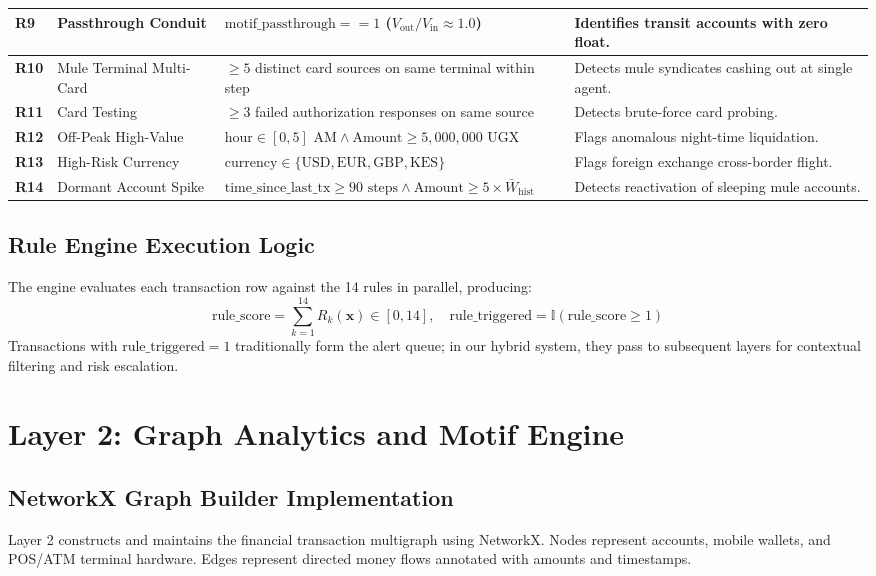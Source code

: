\begin{table}[hbt!]
\begin{adjustbox}{width=\textwidth,center=\textwidth}
\begin{tabular}{|l|l|p{6.5cm}|p{4.2cm}|}
\hline
\textbf{R9} & Passthrough Conduit & $\text{motif\_passthrough} == 1$ ($V_{\text{out}} / V_{\text{in}} \approx 1.0$) & Identifies transit accounts with zero float. \\
\hline
\textbf{R10} & Mule Terminal Multi-Card & $\ge 5$ distinct card sources on same terminal within step & Detects mule syndicates cashing out at single agent. \\
\hline
\textbf{R11} & Card Testing & $\ge 3$ failed authorization responses on same source & Detects brute-force card probing. \\
\hline
\textbf{R12} & Off-Peak High-Value & $\text{hour} \in [0, 5]\text{ AM} \land \text{Amount} \ge 5,000,000\text{ UGX}$ & Flags anomalous night-time liquidation. \\
\hline
\textbf{R13} & High-Risk Currency & $\text{currency} \in \{\text{USD}, \text{EUR}, \text{GBP}, \text{KES}\}$ & Flags foreign exchange cross-border flight. \\
\hline
\textbf{R14} & Dormant Account Spike & $\text{time\_since\_last\_tx} \ge 90\text{ steps} \land \text{Amount} \ge 5 \times \bar{W}_{\text{hist}}$ & Detects reactivation of sleeping mule accounts. \\
\hline
\end{tabular}
\end{adjustbox}
\end{table}

\subsection{Rule Engine Execution Logic}
The engine evaluates each transaction row against the 14 rules in parallel, producing:
\begin{equation}
    \text{rule\_score} = \sum_{k=1}^{14} R_k(\mathbf{x}) \in [0, 14], \quad \text{rule\_triggered} = \mathbb{I}(\text{rule\_score} \ge 1)
\end{equation}
Transactions with $\text{rule\_triggered} = 1$ traditionally form the alert queue; in our hybrid system, they pass to subsequent layers for contextual filtering and risk escalation.

\section{Layer 2: Graph Analytics and Motif Engine}
\subsection{NetworkX Graph Builder Implementation}
Layer 2 constructs and maintains the financial transaction multigraph using NetworkX. Nodes represent accounts, mobile wallets, and POS/ATM terminal hardware. Edges represent directed money flows annotated with amounts and timestamps.

